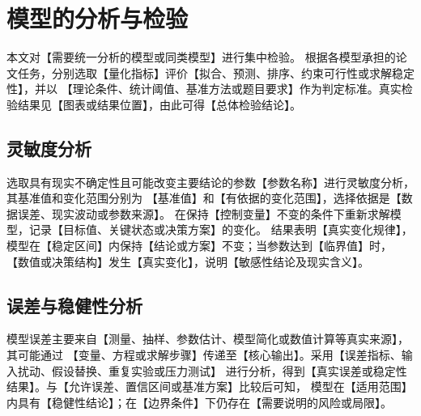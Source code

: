 
\section{模型的分析与检验}

本文对【需要统一分析的模型或同类模型】进行集中检验。
根据各模型承担的论文任务，分别选取【量化指标】评价【拟合、预测、排序、约束可行性或求解稳定性】，并以
【理论条件、统计阈值、基准方法或题目要求】作为判定标准。真实检验结果见【图表或结果位置】，由此可得【总体检验结论】。

\subsection{灵敏度分析}

选取具有现实不确定性且可能改变主要结论的参数【参数名称】进行灵敏度分析，其基准值和变化范围分别为
【基准值】和【有依据的变化范围】，选择依据是【数据误差、现实波动或参数来源】。
在保持【控制变量】不变的条件下重新求解模型，记录【目标值、关键状态或决策方案】的变化。
结果表明【真实变化规律】，模型在【稳定区间】内保持【结论或方案】不变；当参数达到【临界值】时，
【数值或决策结构】发生【真实变化】，说明【敏感性结论及现实含义】。

\subsection{误差与稳健性分析}

模型误差主要来自【测量、抽样、参数估计、模型简化或数值计算等真实来源】，其可能通过
【变量、方程或求解步骤】传递至【核心输出】。采用【误差指标、输入扰动、假设替换、重复实验或压力测试】
进行分析，得到【真实误差或稳定性结果】。与【允许误差、置信区间或基准方案】比较后可知，
模型在【适用范围】内具有【稳健性结论】；在【边界条件】下仍存在【需要说明的风险或局限】。
